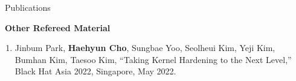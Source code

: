 \documentclass{resume} %
\begin{document}
\begin{rSection}{\faGenderless~Publications}
	\strut\textbullet~{\bf Other Refereed Material}
	\begin{enumerate}[leftmargin=0pt]
		\item Jinbum Park, \textbf{Haehyun Cho}, Sungbae Yoo, Seolheui Kim, Yeji Kim, Bumhan Kim, Taesoo Kim,
		``Taking Kernel Hardening to the Next Level,''
		Black Hat Asia 2022, Singapore, May 2022.
	\end{enumerate}
	
	\vspace{3mm}
\end{rSection}


	

	

\end{document}
